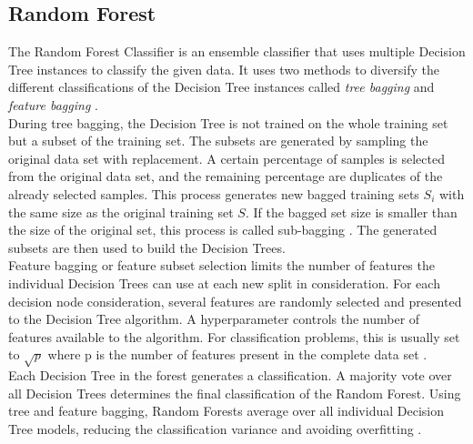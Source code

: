 \subsection{Random Forest}
The Random Forest Classifier is an ensemble classifier that uses multiple 
Decision Tree instances to classify the given data. It uses two methods to 
diversify the different classifications of the Decision Tree instances called 
\textit{tree bagging} and \textit{feature bagging} \cite{RN163}.
\\
During tree bagging, the Decision Tree is not trained on the whole training 
set but a subset of the training set. The subsets are generated by sampling 
the original data set with replacement. A certain percentage of samples 
is selected from the original data set, and the remaining 
percentage are duplicates of the already selected samples. This 
process generates new bagged training sets $S_i$ with the same size as the 
original training set $S$. If the bagged set size is smaller than the 
size of the original set, this process is called sub-bagging \cite{RN163, 
RN170}. The generated subsets are then used to build the Decision Trees.
\\
Feature bagging or feature subset selection limits the number of features the 
individual Decision Trees can use at each new split in consideration. 
For each decision node consideration, several features are randomly 
selected and presented to the Decision Tree algorithm. A hyperparameter 
controls the number of features available to the algorithm. For 
classification problems, this is usually set to $\sqrt{p}$ where p is the 
number of features present in the complete data set \cite{RN163, RN166}.
\\
Each Decision Tree in the forest generates a classification. A majority vote 
over all Decision Trees determines the final classification of the Random 
Forest. Using tree and feature bagging, Random Forests average over 
all individual Decision Tree models, reducing the classification variance and 
avoiding overfitting \cite{RN166}.
